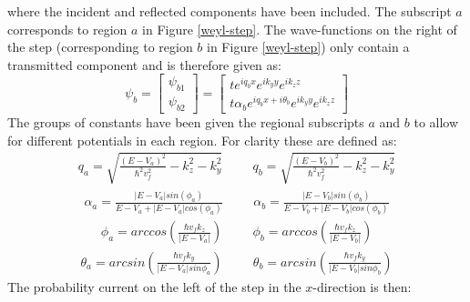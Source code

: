 \documentclass[12pt,a4paper]{article}
\begin{document}
		where the incident and reflected components have been included. The subscript $a$ corresponds to region $a$ in Figure \ref{weyl-step}. The wave-functions on the right of the step (corresponding to region $b$ in Figure \ref{weyl-step}) only contain a transmitted component and is therefore given as:
		\begin{equation}
			\psi_{b}=
			\left[\begin{array}{ccc}
				\psi_{b1}\\
				\psi_{b2}
			\end{array}\right]
			=
			\left[\begin{array}{ccc}
				te^{iq_{b}x}e^{ik_{y}y}e^{ik_{z}z}\\
				t\alpha_{b}e^{iq_{b}x+i\theta_{b}}e^{ik_{y}y}e^{ik_{z}z}
			\end{array}\right]
		\end{equation}
		The groups of constants have been given the regional subscripts $a$ and $b$ to allow for different potentials in each region. For clarity these are defined as:
		\begin{align}
		q_{a}=\sqrt{\frac{\left(E-V_{a}\right)^{2}}{\hbar^{2}v_{f}^{2}}-k_{z}^{2}-k_{y}^{2}}\hspace{1cm}q_{b}=\sqrt{\frac{\left(E-V_{b}\right)^{2}}{\hbar^{2}v_{f}^{2}}-k_{z}^{2}-k_{y}^{2}}
		\end{align}
		\begin{align}
		\alpha_{a}=\frac{|E-V_{a}|sin\left(\phi_{a}\right)}{E-V_{a}+|E-V_{a}|cos\left(\phi_{a}\right)} \hspace{1cm} \alpha_{b}=\frac{|E-V_{b}|sin\left(\phi_{b}\right)}{E-V_{b}+|E-V_{b}|cos\left(\phi_{b}\right)}
		\end{align}
		\begin{align}
		\phi_{a}=arccos\left(\frac{\hbar v_{f} k_{z}}{|E-V_{a}|}\right)\hspace{1cm}\phi_{b}=arccos\left(\frac{\hbar v_{f} k_{z}}{|E-V_{b}|}\right)
		\end{align}
		\begin{align}
		\theta_{a}=arcsin\left(\frac{\hbar v_{f} k_{y}}{|E-V_{a}|sin\phi_{a}}\right)\hspace{1cm}\theta_{b}=arcsin\left(\frac{\hbar v_{f} k_{y}}{|E-V_{b}|sin\phi_{b}}\right)
		\end{align}
 		The probability current on the left of the step in the $x$-direction is then:
\end{document}
